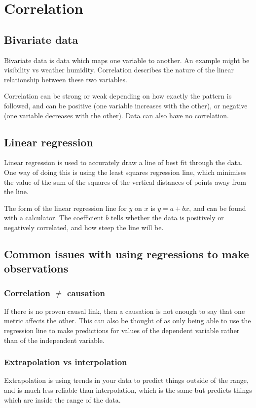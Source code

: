 \section{Correlation}
\subsection{Bivariate data}
Bivariate data is data which maps one variable to another. An example might be visibility vs weather humidity. Correlation describes the nature of the linear relationship between these two variables.

Correlation can be strong or weak depending on how exactly the pattern is followed, and can be positive (one variable increases with the other), or negative (one variable decreases with the other). Data can also have no correlation.

\subsection{Linear regression}
Linear regression is used to accurately draw a line of best fit through the data. One way of doing this is using the least squares regression line, which minimises the value of the sum of the squares of the vertical distances of points away from the line.

The form of the linear regression line for $y$ on $x$ is $y=a+bx$, and can be found with a calculator. The coefficient $b$ tells whether the data is positively or negatively correlated, and how steep the line will be.

\subsection{Common issues with using regressions to make observations}
\subsubsection{Correlation $\ne$ causation}
If there is no proven causal link, then a causation is not enough to say that one metric affects the other. This can also be thought of as only being able to use the regression line to make predictions for values of the dependent variable rather than of the independent variable.

\subsubsection{Extrapolation vs interpolation}
Extrapolation is using trends in your data to predict things outside of the range, and is much less reliable than interpolation, which is the same but predicts things which are inside the range of the data.
